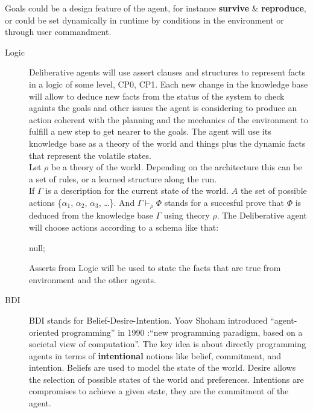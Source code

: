 \documentclass[11pt,oneside,a4paper,openright]{report}
\begin{document}
\begin{description}
	Goals could be a design feature of the agent, for instance \textbf{survive} \& \textbf{reproduce}, or could 
	be set dynamically in runtime by conditions in the environment or through user commandment.

	\begin{description} 
		\item [Logic] Deliberative agents will use assert clauses and structures to represent facts in 
		a logic of some level, CP0, CP1. Each new change in the knowledge base will allow to deduce
		new facts from the status of the system to check againts the goals and other issues the agent
		is considering to produce an action coherent with the planning and the mechanics of the environment
		to fulfill a new step to get nearer to the goals.
		The agent will use its knowledge base as a theory of the world and things plus the dynamic facts
		that represent the volatile states.\\
		Let $\rho$ be a theory of the world. Depending on the architecture this can be a set of rules,
		or a learned structure along the run.\\ 
		If $\Gamma$ is a description for the current state of the world. $A$ the set of possible actions 
		\{$\alpha_1$, $\alpha_2$, $\alpha_3$, \ldots\}. And $\Gamma \vdash_{\rho} \Phi$ stands for a succesful 
		prove that $\Phi$ is deduced from the knowledge base $\Gamma$ using theory $\rho$. The Deliberative 
		agent will choose actions according to a schema like that:

		\begin{algorithm}[H]

		\Return null;
		\end{algorithm}

		Asserts from Logic will be used to state the facts that are true from environment
		and the other agents.
		
		\item [BDI] BDI stands for Belief-Desire-Intention. Yoav Shoham introduced “agent-oriented 
		programming” in 1990 \cite{Shoham1990}:“new programming paradigm, based on a societal view of
		computation”. The key idea is about directly programming agents in terms of \textbf{intentional}
		notions like belief, commitment, and intention.	Beliefs are used to model the state of the world.
		Desire allows the selection of possible states of the world and preferences. Intentions are 
		compromises to achieve a given state, they are the commitment of the agent.


\end{description}
\end{description}
\end{document}

